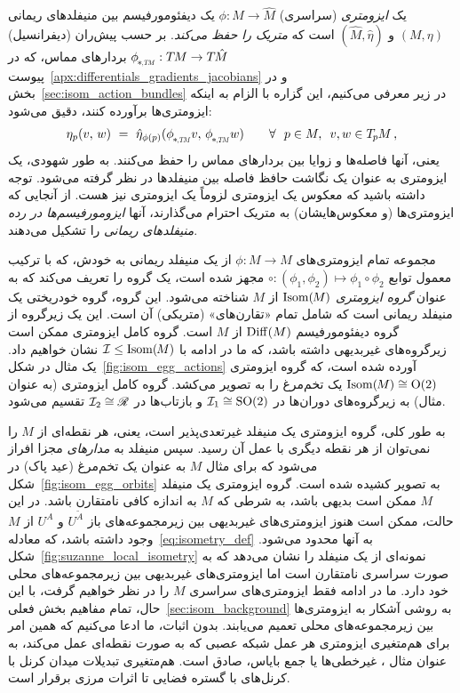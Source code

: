 یک \emph{ایزومتری} (سراسری) $\phi: M \to \hat{M}$ یک دیفئومورفیسم بین منیفلدهای ریمانی $(M,\eta)$ و $(\hat{M},\hat{\eta})$ است که \emph{متریک را حفظ می‌کند}.
بر حسب پیش‌ران (دیفرانسیل) $\dphiTM: \TM \to T\mkern-1.5mu\hat{M}$ بردارهای مماس، که در پیوست~\ref{apx:differentials_gradients_jacobians} و در بخش~\ref{sec:isom_action_bundles} در زیر معرفی می‌کنیم، این گزاره با الزام به اینکه ایزومتری‌ها برآورده کنند، دقیق می‌شود:
\begin{align}\label{eq:isometry_def}
    \eta_p(v,\, w)\ =\ \hat{\eta}_{\phi(p)}( \dphiTM v,\, \dphiTM w) \qquad \forall\ \ p\in M,\,\ v,w\in \TpM \,,
\end{align}
یعنی، آنها فاصله‌ها و زوایا بین بردارهای مماس را حفظ می‌کنند.
به طور شهودی، یک ایزومتری به عنوان یک نگاشت حافظ فاصله بین منیفلدها در نظر گرفته می‌شود.
توجه داشته باشید که معکوس یک ایزومتری لزوماً یک ایزومتری نیز هست.
از آنجایی که ایزومتری‌ها (و معکوس‌هایشان) به متریک احترام می‌گذارند، آنها \emph{ایزومورفیسم‌ها در رده منیفلدهای ریمانی} را تشکیل می‌دهند.


مجموعه تمام ایزومتری‌های $\phi: M \to M$ از یک منیفلد ریمانی به خودش، که با ترکیب معمول توابع $\circ: (\phi_1, \phi_2) \mapsto \phi_1 \circ \phi_2$ مجهز شده است، یک گروه را تعریف می‌کند که به عنوان \emph{گروه ایزومتری} $\operatorname{Isom}(\mkern-1.5mu M \mkern-.5mu)$ از $M$ شناخته می‌شود.
این گروه، گروه خودریختی یک منیفلد ریمانی است که شامل تمام «تقارن‌های» (متریکی) آن است.
این یک زیرگروه از گروه دیفئومورفیسم $\operatorname{Diff}(M)$ از $M$ است.
گروه کامل ایزومتری ممکن است زیرگروه‌های غیربدیهی داشته باشد، که ما در ادامه با $\mathcal{I} \leq \operatorname{Isom}(\mkern-1.5mu M \mkern-.5mu)$ نشان خواهیم داد.
یک مثال در شکل~\ref{fig:isom_egg_actions} آورده شده است، که گروه ایزومتری $\operatorname{Isom}(\mkern-1.5mu M \mkern-.5mu) \cong \operatorname{O}(2)$ یک تخم‌مرغ را به تصویر می‌کشد.
گروه کامل ایزومتری (به عنوان مثال) به زیرگروه‌های دوران‌ها در $\mathcal{I}_1 \cong \operatorname{SO}(2)$ و بازتاب‌ها در $\mathcal{I}_2 \cong \mathscr{R}$ تقسیم می‌شود.


به طور کلی، گروه ایزومتری یک منیفلد غیرتعدی‌پذیر است، یعنی، هر نقطه‌ای از $M$ را نمی‌توان از هر نقطه دیگری با عمل آن رسید.
سپس منیفلد به \emph{مدارهای} مجزا افراز می‌شود که برای مثال $M$ به عنوان یک تخم‌مرغ (عید پاک) در شکل~\ref{fig:isom_egg_orbits} به تصویر کشیده شده است.
گروه ایزومتری یک منیفلد $M$ ممکن است بدیهی باشد، به شرطی که $M$ به اندازه کافی نامتقارن باشد.
در این حالت، ممکن است هنوز ایزومتری‌های غیربدیهی بین زیرمجموعه‌های باز $U^{\widetilde{A}}$ و $U^A$ از $M$ وجود داشته باشد، که معادله~\eqref{eq:isometry_def} به آنها محدود می‌شود.
شکل~\ref{fig:suzanne_local_isometry} نمونه‌ای از یک منیفلد را نشان می‌دهد که به صورت سراسری نامتقارن است اما ایزومتری‌های غیربدیهی بین زیرمجموعه‌های محلی خود دارد.
ما در ادامه فقط ایزومتری‌های سراسری $M$ را در نظر خواهیم گرفت، با این حال، تمام مفاهیم بخش فعلی~\ref{sec:isom_background} به روشی آشکار به ایزومتری‌ها بین زیرمجموعه‌های محلی تعمیم می‌یابند.
بدون اثبات، ما ادعا می‌کنیم که همین امر برای هم‌متغیری ایزومتری هر عمل شبکه عصبی که به صورت نقطه‌ای عمل می‌کند، به عنوان مثال \onexones، غیرخطی‌ها یا جمع بایاس، صادق است.
هم‌متغیری تبدیلات میدان کرنل با کرنل‌های با گستره فضایی تا اثرات مرزی برقرار است.


